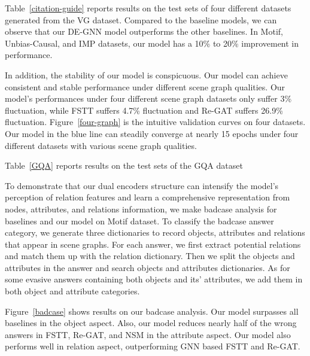 \documentclass[letterpaper]{article} %
\begin{document}
Table~\ref{citation-guide} reports results on the test sets of four different datasets generated from the VG dataset. Compared to the baseline models, we can observe that our DE-GNN model outperforms the other baselines. In Motif, Unbias-Causal, and IMP datasets, our model has a 10\% to 20\% improvement in performance.

In addition, the stability of our model is conspicuous. Our model can achieve consistent and stable performance under different scene graph qualities. Our model's performances under four different scene graph datasets only suffer 3\% fluctuation,
while FSTT suffers 4.7\% fluctuation and Re-GAT suffers 26.9\% fluctuation. Figure~\ref{four-graph} is the intuitive validation curves on four datasets. Our model in the blue line can steadily converge at nearly 15 epochs under four different datasets with various scene graph qualities. 

Table~\ref{GQA} reports results on the test sets of the GQA dataset

To demonstrate that our dual encoders structure can intensify the model’s perception of relation features and learn a comprehensive representation from nodes, attributes, and relations information, we make badcase analysis for baselines and our model on Motif dataset. To classify the badcase answer category, we generate three dictionaries to record objects, attributes and relations that appear in scene graphs. For each answer, we first extract potential relations and match them up with the relation dictionary. Then we split the objects and attributes in the answer and search objects and attributes dictionaries. As for some evasive answers containing both objects and its' attributes, we add them in both object and attribute categories. 

Figure~\ref{badcase} shows results on our badcase analysis. Our model surpasses all baselines in the object aspect. Also, our model reduces nearly half of the wrong answers in FSTT, Re-GAT, and NSM in the attribute aspect. Our model also performs well in relation aspect, outperforming GNN based FSTT and Re-GAT.
\end{document}
